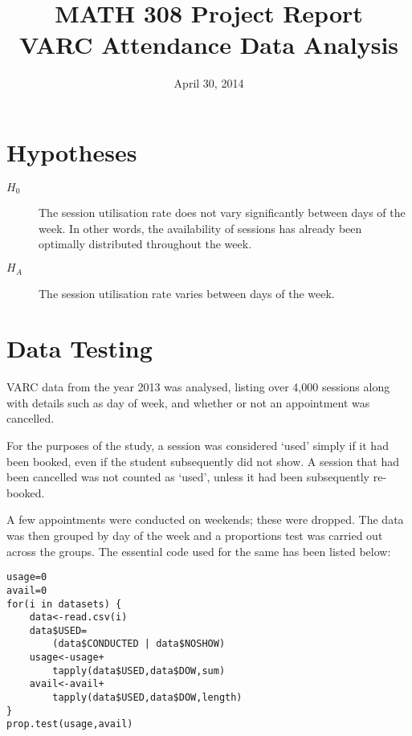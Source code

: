 \documentclass[twocolumn]{article}
\title{MATH 308 Project Report\\VARC Attendance Data Analysis}
\date{April 30, 2014}
\begin{document}
\maketitle
\thispagestyle{empty}


\section{Hypotheses}
\begin{description}
	\item[$H_0$] The session utilisation rate does not vary significantly between days of the week. In other words, the availability of sessions has already been optimally distributed throughout the week.
	\item[$H_A$] The session utilisation rate varies between days of the week.
\end{description}

\section{Data Testing}
VARC data from the year 2013 was analysed, listing over 4,000 sessions along with details such as day of week, and whether or not an appointment was cancelled.

For the purposes of the study, a session was considered `used' simply if it had been booked, even if the student subsequently did not show. A session that had been cancelled was not counted as `used', unless it had been subsequently re-booked.

A few appointments were conducted on weekends; these were dropped. The data was then grouped by day of the week and a proportions test was carried out across the groups. The essential  code used for the same has been listed below:

\begin{lstlisting}
usage=0
avail=0
for(i in datasets) {
	data<-read.csv(i)
	data$USED=
		(data$CONDUCTED | data$NOSHOW)
	usage<-usage+
		tapply(data$USED,data$DOW,sum)
	avail<-avail+
		tapply(data$USED,data$DOW,length)
}
prop.test(usage,avail)
\end{lstlisting}
\vspace{-1.5em}
\end{document}
